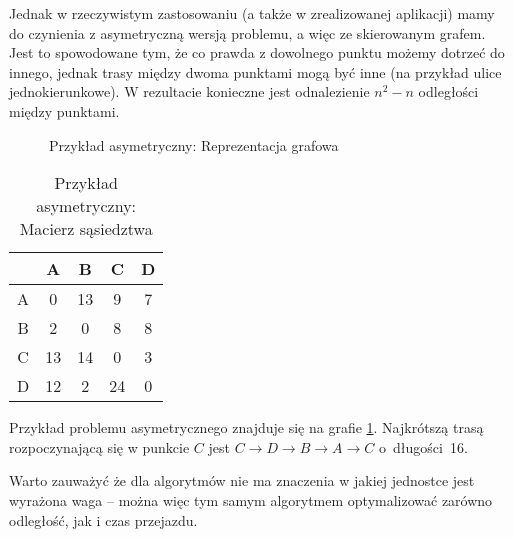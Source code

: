 Jednak w rzeczywistym zastosowaniu (a także w zrealizowanej aplikacji) mamy do czynienia z asymetryczną wersją problemu, a więc ze skierowanym grafem. Jest to spowodowane tym, że co prawda z dowolnego punktu możemy dotrzeć do innego, jednak trasy między dwoma punktami mogą być inne (na przykład ulice jednokierunkowe). W rezultacie konieczne jest odnalezienie $n^2-n$ odległości między punktami.
\begin{figure}[H]
	\centering
	\def\svgwidth{0.6\columnwidth}
	
	\caption{Przykład asymetryczny: Reprezentacja grafowa}
	\label{fig:przyklad2_komiwojazer_graf}
\end{figure}

\begin{table}[H]
	\begin{center}
		\begin{tabular}
			{  c | c c c c }
			& A & B & C & D \\
			\hline
			A & 0  & 13 & 9  &  7 \\
			B & 2  & 0  & 8  &  8 \\
			C & 13 & 14 & 0  &  3 \\
			D & 12 & 2  & 24 &  0 \\
		\end{tabular}
	\end{center}
	\caption{Przykład asymetryczny: Macierz sąsiedztwa}
\end{table}

Przykład problemu asymetrycznego znajduje się na grafie \ref{fig:przyklad2_komiwojazer_graf}. Najkrótszą trasą rozpoczynającą się w punkcie $C$ jest $C \to D \to B \to A \to C$ o~długości~16.

Warto zauważyć że dla algorytmów nie ma znaczenia w jakiej jednostce jest wyrażona waga -- można więc tym samym algorytmem optymalizować zarówno odległość, jak i czas przejazdu.

\clearpage